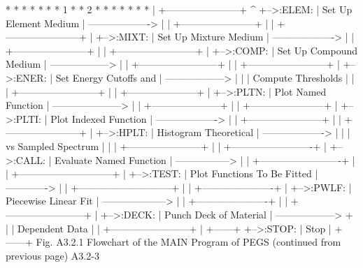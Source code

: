 \newpage {}
\begin{center}
\begin{boxedverbatim}
   *                                                         *
  * *                                                       * *
 * 1 *                                                     * 2 *
  * *                                                       * *
   *                                                         *
   |          +-----------------------+                      ^
   +-->:ELEM: | Set Up Element Medium | -------------------> |
   |          +-----------------------+                      |
   |          +-----------------------+                      |
   +-->:MIXT: | Set Up Mixture Medium | -------------------> |
   |          +-----------------------+                      |
   |          +------------------------+                     |
   +-->:COMP: | Set Up Compound Medium | ------------------> |
   |          +------------------------+                     |
   |          +------------------------+                     |
   +-->:ENER: | Set Energy Cutoffs and | ------------------> |
   |          | Compute Thresholds     |                     |
   |          +------------------------+                     |
   |          +---------------------+                        |
   +-->:PLTN: | Plot Named Function | ---------------------> |
   |          +---------------------+                        |
   |          +-----------------------+                      |
   +-->:PLTI: | Plot Indexed Function | -------------------> |
   |          +-----------------------+                      |
   |          +-----------------------+                      |
   +-->:HPLT: | Histogram Theoretical | -------------------> |
   |          |  vs Sampled Spectrum  |                      |
   |          +-----------------------+                      |
   |          +-------------------------+                    |
   +-->:CALL: | Evaluate Named Function | -----------------> |
   |          +-------------------------+                    |
   |          +-----------------------------+                |
   +-->:TEST: | Plot Functions To Be Fitted | -------------> |
   |          +-----------------------------+                |
   |          +----------------------+                       |
   +-->:PWLF: | Piecewise Linear Fit | --------------------> |
   |          +----------------------+                       |
   |          +------------------------+                     |
   +-->:DECK: | Punch Deck of Material | ------------------> +
   |          | Dependent Data         |
   |          +------------------------+
   |          +------+
   +-->:STOP: | Stop |
              +------+
      Fig. A3.2.1  Flowchart of the MAIN Program of PEGS
                     (continued from previous page)
 A3.2-3
\end{boxedverbatim}
\end{center}
